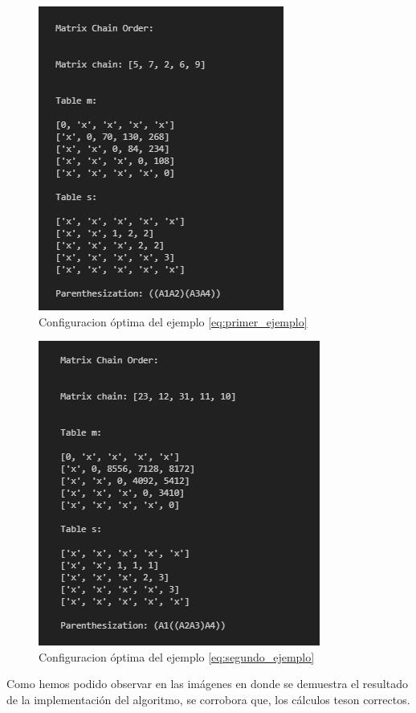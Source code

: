 \documentclass[12pt,twoside]{article}
\begin{document}
\begin{figure}[ht]
    \centering
    \includegraphics{1.png}
    \caption{Configuracion \'optima del ejemplo \ref{eq:primer_ejemplo}}
    \label{fig:programa_primer}
\end{figure}

\begin{figure}[ht]
    \centering
    \includegraphics{2.png}
    \caption{Configuracion \'optima del ejemplo \ref{eq:segundo_ejemplo}}
    \label{fig:programa_segundo}
\end{figure}
\newline \newline
Como hemos podido observar en las im\'agenes en donde se demuestra el resultado de la implementaci\'on del algoritmo, se corrobora que, los c\'alculos te son correctos.
\newpage
\vfill
\clearpage
\end{document}
